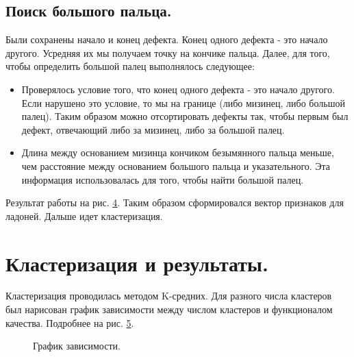 \documentclass[12pt,fleqn]{article}
\begin{document}
\subsection{Поиск большого пальца.}
Были сохранены начало и конец дефекта. Конец одного дефекта - это начало другого. Усредняя их мы получаем точку на кончике пальца. Далее, для того, чтобы определить большой палец выполнялось следующее:
\begin{itemize}
\item Проверялось условие того, что конец одного дефекта - это начало другого. Если нарушено это условие, то мы на границе (либо мизинец, либо большой палец). Таким образом можно отсортировать дефекты так, чтобы первым был дефект, отвечающий либо за мизинец, либо за большой палец.
\item Длина между основанием мизинца кончиком безымянного пальца меньше, чем расстояние между основанием большого пальца и указательного. Эта информация использовалась для того, чтобы найти большой палец.
\end{itemize}

Результат работы на рис. \hyperref[Image4]{4}. Таким образом сформировался вектор признаков для ладоней. Дальше идет кластеризация.
 
\newpage
\section{Кластеризация и результаты.}

Кластеризация проводилась методом K-средних. Для разного числа кластеров был нарисован график зависимости между числом кластеров и функционалом качества. Подробнее на рис. \hyperref[Image5]{5}.

\begin{figure}[h]
\caption{График зависимости.}
\label{Image5}
\end{figure}
\end{document}
